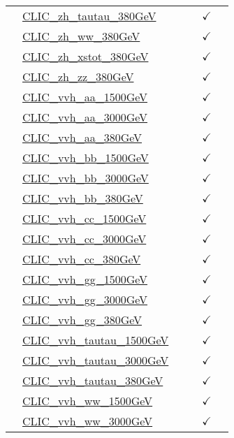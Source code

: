 \documentclass{article}
\begin{document}
\begin{longtable}{|c|l|c|c|c|c|}
 & \href{https://arxiv.org}{CLIC_zh_tautau_380GeV}  &  &  & $\checkmark$ & \\ \cline{2-6}
 & \href{https://arxiv.org}{CLIC_zh_ww_380GeV}  &  &  & $\checkmark$ & \\ \cline{2-6}
 & \href{https://arxiv.org}{CLIC_zh_xstot_380GeV}  &  &  & $\checkmark$ & \\ \cline{2-6}
 & \href{https://arxiv.org}{CLIC_zh_zz_380GeV}  &  &  & $\checkmark$ & \\ \cline{2-6}
 & \href{https://arxiv.org}{CLIC_vvh_aa_1500GeV}  &  &  & $\checkmark$ & \\ \cline{2-6}
 & \href{https://arxiv.org}{CLIC_vvh_aa_3000GeV}  &  &  & $\checkmark$ & \\ \cline{2-6}
 & \href{https://arxiv.org}{CLIC_vvh_aa_380GeV}  &  &  & $\checkmark$ & \\ \cline{2-6}
 & \href{https://arxiv.org}{CLIC_vvh_bb_1500GeV}  &  &  & $\checkmark$ & \\ \cline{2-6}
 & \href{https://arxiv.org}{CLIC_vvh_bb_3000GeV}  &  &  & $\checkmark$ & \\ \cline{2-6}
 & \href{https://arxiv.org}{CLIC_vvh_bb_380GeV}  &  &  & $\checkmark$ & \\ \cline{2-6}
 & \href{https://arxiv.org}{CLIC_vvh_cc_1500GeV}  &  &  & $\checkmark$ & \\ \cline{2-6}
 & \href{https://arxiv.org}{CLIC_vvh_cc_3000GeV}  &  &  & $\checkmark$ & \\ \cline{2-6}
 & \href{https://arxiv.org}{CLIC_vvh_cc_380GeV}  &  &  & $\checkmark$ & \\ \cline{2-6}
 & \href{https://arxiv.org}{CLIC_vvh_gg_1500GeV}  &  &  & $\checkmark$ & \\ \cline{2-6}
 & \href{https://arxiv.org}{CLIC_vvh_gg_3000GeV}  &  &  & $\checkmark$ & \\ \cline{2-6}
 & \href{https://arxiv.org}{CLIC_vvh_gg_380GeV}  &  &  & $\checkmark$ & \\ \cline{2-6}
 & \href{https://arxiv.org}{CLIC_vvh_tautau_1500GeV}  &  &  & $\checkmark$ & \\ \cline{2-6}
 & \href{https://arxiv.org}{CLIC_vvh_tautau_3000GeV}  &  &  & $\checkmark$ & \\ \cline{2-6}
 & \href{https://arxiv.org}{CLIC_vvh_tautau_380GeV}  &  &  & $\checkmark$ & \\ \cline{2-6}
 & \href{https://arxiv.org}{CLIC_vvh_ww_1500GeV}  &  &  & $\checkmark$ & \\ \cline{2-6}
 & \href{https://arxiv.org}{CLIC_vvh_ww_3000GeV}  &  &  & $\checkmark$ & \\ \cline{2-6}

\end{longtable}
\end{document}
